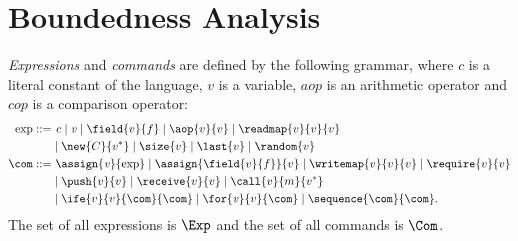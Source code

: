 \section{Boundedness Analysis}\label{sec:analysis}

\begin{definition}\label{def:exp_com}
  \emph{Expressions} and \emph{commands} are defined by the following grammar,
  where $c$ is a literal constant of the language, $v$ is a variable, $\mathit{aop}$ is an arithmetic
  operator and $\mathit{cop}$ is a comparison operator:
  \begin{align*}
    \exp::=&\ \mathit{c}\mid\mathit{v}\mid\field{v}{f}\mid\aop{v}{v}\mid\readmap{v}{v}{v}\\
    &\mid\new{C}{v^*}\mid\size{v}\mid\last{v}\mid\random{v}\\
    \com::=&\ \assign{\mathit{v}}{\exp}\mid\assign{\field{v}{f}}{v}\mid\writemap{v}{v}{v}
    \mid\require{v}{v}\\
    &\mid\push{v}{v}\mid\receive{v}{v}\mid\call{v}{m}{v^*}\\
    &\mid\ife{v}{v}{\com}{\com}\mid\for{\mathit{v}}{v}{\com}\mid\sequence{\com}{\com}.
  \end{align*}
  The set of all expressions is $\Exp$ and the set of all commands is $\Com$.
\end{definition}


